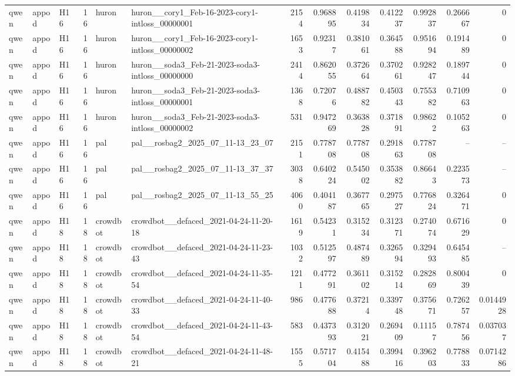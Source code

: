\begin{longtable}{lllrllrrrrrrr}
qwen & appod & H16 & 16 & huron & huron\_\_cory1\_Feb-16-2023-cory1-intloss\_00000001 & 2154 & 0.968895 & 0.419834 & 0.412237 & 0.992837 & 0.266667 & 0 \\
qwen & appod & H16 & 16 & huron & huron\_\_cory1\_Feb-16-2023-cory1-intloss\_00000002 & 1653 & 0.92317 & 0.381061 & 0.364588 & 0.951694 & 0.191489 & 0 \\
qwen & appod & H16 & 16 & huron & huron\_\_soda3\_Feb-21-2023-soda3-intloss\_00000000 & 2414 & 0.862055 & 0.372664 & 0.370261 & 0.928247 & 0.189744 & 0 \\
qwen & appod & H16 & 16 & huron & huron\_\_soda3\_Feb-21-2023-soda3-intloss\_00000001 & 1368 & 0.72076 & 0.488782 & 0.450343 & 0.755382 & 0.710963 & 0 \\
qwen & appod & H16 & 16 & huron & huron\_\_soda3\_Feb-21-2023-soda3-intloss\_00000002 & 531 & 0.947269 & 0.363828 & 0.371891 & 0.98622 & 0.105263 & 0 \\
qwen & appod & H16 & 16 & pal & pal\_\_rosbag2\_2025\_07\_11-13\_23\_07 & 2151 & 0.778708 & 0.778708 & 0.291863 & 0.778708 & -- & -- \\
qwen & appod & H16 & 16 & pal & pal\_\_rosbag2\_2025\_07\_11-13\_37\_37 & 3038 & 0.640224 & 0.545002 & 0.353882 & 0.86643 & 0.223573 & -- \\
qwen & appod & H16 & 16 & pal & pal\_\_rosbag2\_2025\_07\_11-13\_55\_25 & 4060 & 0.404187 & 0.367765 & 0.297527 & 0.776824 & 0.326471 & 0 \\
qwen & appod & H18 & 18 & crowdbot & crowdbot\_\_defaced\_2021-04-24-11-20-18 & 1619 & 0.54231 & 0.315234 & 0.312371 & 0.274074 & 0.671629 & 0 \\
qwen & appod & H18 & 18 & crowdbot & crowdbot\_\_defaced\_2021-04-24-11-23-43 & 1032 & 0.512597 & 0.487489 & 0.326594 & 0.329493 & 0.645485 & -- \\
qwen & appod & H18 & 18 & crowdbot & crowdbot\_\_defaced\_2021-04-24-11-35-54 & 1211 & 0.477291 & 0.361102 & 0.315214 & 0.282869 & 0.800439 & 0 \\
qwen & appod & H18 & 18 & crowdbot & crowdbot\_\_defaced\_2021-04-24-11-40-33 & 986 & 0.477688 & 0.37214 & 0.339748 & 0.375671 & 0.726257 & 0.0144928 \\
qwen & appod & H18 & 18 & crowdbot & crowdbot\_\_defaced\_2021-04-24-11-43-54 & 583 & 0.437393 & 0.312021 & 0.269409 & 0.11157 & 0.787456 & 0.037037 \\
qwen & appod & H18 & 18 & crowdbot & crowdbot\_\_defaced\_2021-04-24-11-48-21 & 1555 & 0.571704 & 0.415488 & 0.399416 & 0.396203 & 0.778833 & 0.0714286 \\

\end{longtable}
